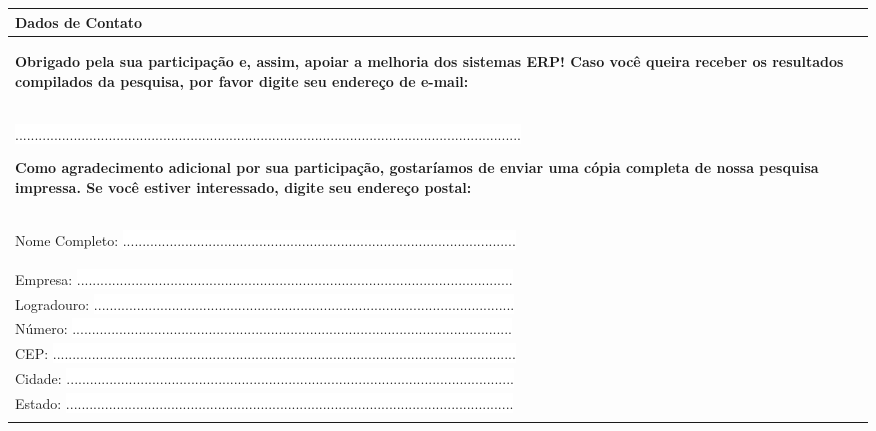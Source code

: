 \bigskip

\noindent  \begin{longtable}{|p{15.7cm}|}
	\hline
	\tabitem \textbf{Dados de Contato} \\
	\hline
	\begin{Spacing}{0.8} 
		\textbf{Obrigado pela sua participação e, assim, apoiar a melhoria dos sistemas ERP! Caso você queira receber os resultados compilados da pesquisa, por favor digite seu endereço de e-mail:} \end{Spacing} \\
	\begin{Spacing}{0.0} 
		\tiny \end{Spacing} 
	\colorbox{white}{ .................................................................................................................................. } 
	\begin{Spacing}{2.0} \end{Spacing}
	\begin{Spacing}{0.8} 
		\textbf{Como agradecimento adicional por sua participação, gostaríamos de enviar uma cópia completa de nossa pesquisa impressa. Se você estiver interessado, digite seu endereço postal:} \end{Spacing} 
	\begin{Spacing}{0.5} \end{Spacing}\\
	\begin{Spacing}{0.5} \end{Spacing}
	Nome Completo: \colorbox{white}{ ..................................................................................................... } \\
	Empresa: \colorbox{white}{ ................................................................................................................ } \\
	Logradouro: \colorbox{white}{ ............................................................................................................ } \\
	Número: \colorbox{white}{ ................................................................................................................. } \\
	CEP: \colorbox{white}{ ....................................................................................................................... } \\
	Cidade: \colorbox{white}{ ................................................................................................................... } \\
	Estado: \colorbox{white}{ ................................................................................................................... } \\
	\\
	\hline
\end{longtable}